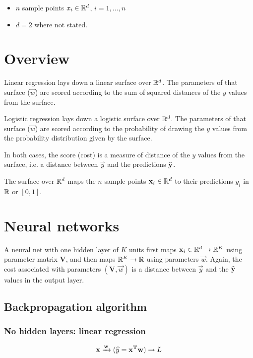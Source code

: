 \renewcommand{\mat}{\mathbf}

\begin{itemize}
\item $n$ sample points $x_i \in \mathbb{R}^d$, $i = 1, \ldots, n$
\item $d = 2$ where not stated.
\end{itemize}

\section{Overview}

Linear regression lays down a linear surface over $\mathbb{R}^d$. The parameters of
that surface ($\vec w$) are scored according to the sum of squared distances of
the $y$ values from the surface.

Logistic regression lays down a logistic surface over $\mathbb{R}^d$. The parameters of
that surface ($\vec w$) are scored according to the probability of drawing the
$y$ values from the probability distribution given by the surface.

In both cases, the score (cost) is a measure of distance of the $y$ values from
the surface, i.e. a distance between $\vec y$ and the predictions
$\widehat {\mathbf y}$.

The surface over $\mathbb{R}^d$ maps the $n$ sample points $\mathbf x_i \in \mathbb{R}^d$ to their
predictions $y_i$ in $\mathbb{R}$ or $[0, 1]$.

\section{Neural networks}

A neural net with one hidden layer of $K$ units first maps
$\mathbf x_i \in \mathbb{R}^d \to \mathbb{R}^K$ using parameter matrix $\mat V$, and then maps
$\mathbb{R}^K \to \mathbb{R}$ using parameters $\vec w$. Again, the cost associated with
parameters $(\mat V, \vec w)$ is a distance between $\vec y$ and the
$\widehat {\mathbf y}$ values in the output layer.

\subsection{Backpropagation algorithm}

\subsubsection{No hidden layers: linear regression}

\begin{align*}
  \mathbf x \xrightarrow{\mathbf w} (\widehat y = \mathbf x^{\mathbf{T}}\mathbf w) \rightarrow L
\end{align*}

